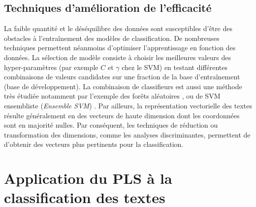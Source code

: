 \subsection{Techniques d'amélioration de l'efficacité}
La faible quantité \citep{ruparel2013smalldataclass} et le déséquilibre des données sont susceptibles d'être des obstacles à l'entraînement des modèles de classification. De nombreuses techniques permettent néanmoins d'optimiser l'apprentissage en fonction des données. La sélection de modèle consiste à choisir les meilleures valeurs des hyper-paramètres (par exemple $C$ et $\gamma$ chez le SVM) en testant différentes combinaisons de valeurs candidates sur une fraction de la base d'entraînement (base de développement). La combinaison de classifieurs est aussi une méthode très étudiée \citep{kittler1996combiningclassifiers,kuncheva2004combiningclassifiers, tulyakov2008combiningclassifiers} notamment par l'exemple des forêts aléatoires \citep{breiman2001randomforest}, ou de SVM ensembliste (\textit{Ensemble SVM}) \citep{dong2005ensembleSVM}.
Par ailleurs, la représentation vectorielle des textes résulte généralement en des vecteurs de haute dimension dont les  coordonnées sont en majorité nulles. Par conséquent, les techniques de réduction ou transformation des dimensions, comme les analyses discriminantes, permettent de d'obtenir des vecteurs plus pertinents pour la classification.

\section{Application du PLS  à la classification des textes}
\label{sec:sensresultat:pls}

